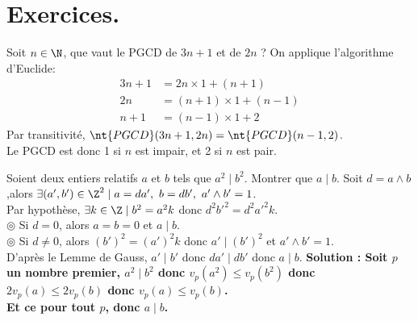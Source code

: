 \documentclass[11pt]{article}
\newcommand*{\PGCD}{\nt{PGCD}}
\begin{document}
\section{Exercices.}

\begin{exercice}{}{}
    Soit $n\in\N$, que vaut le PGCD de $3n+1$ et de $2n$ ?
    \tcblower
    On applique l'algorithme d'Euclide:
    \begin{align*}
        3n+1 &= 2n\times1+(n+1)\\
        2n &= (n+1)\times1+(n-1)\\
        n+1 &= (n-1)\times1+2
    \end{align*}
    Par transitivité, $\PGCD(3n+1,2n)=\PGCD(n-1,2)$.\\
    Le PGCD est donc 1 si $n$ est impair, et 2 si $n$ est pair.
\end{exercice}

\begin{exercice}{}{}
    Soient deux entiers relatifs $a$ et $b$ tels que $a^2\mid b^2$. Montrer que $a\mid b$.
    \tcblower
    Soit $d=a\land b$ ,alors $\exists (a',b')\in\Z^2\mid a=da',~b=db',~a'\land b'=1$.\\
    Par hypothèse, $\exists k \in \Z \mid b^2=a^2k$ donc $d^2{b'}^2=d^2{a'}^2k$.\\
    $\circledcirc$ Si $d=0$, alors $a=b=0$ et $a\mid b$.\\
    $\circledcirc$ Si $d\neq 0$, alors $(b')^2=(a')^2k$ donc $a'\mid(b')^2$ et $a'\land b'=1$.\\
    D'après le Lemme de Gauss, $a'\mid b'$ donc $da'\mid db'$ donc $a\mid b$.\n
    \bf{Solution :}\n
    Soit $p$ un nombre premier, $a^2\mid b^2$ donc $v_p(a^2)\leq v_p(b^2)$ donc $2v_p(a)\leq2v_p(b)$ donc $v_p(a)\leq v_p(b)$.\\
    Et ce pour tout $p$, donc $a\mid b$.
\end{exercice}
\end{document}
